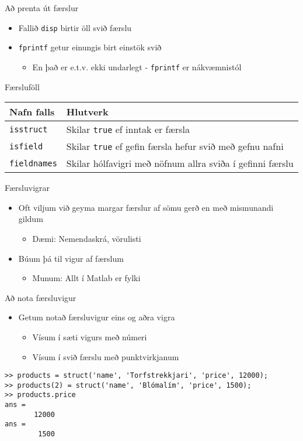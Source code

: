 \documentclass[handout]{beamer}
\begin{document}
\begin{frame}{Að prenta út færslur}
\begin{itemize}
 \item Fallið \texttt{disp} birtir öll svið færslu
 \item \texttt{fprintf} getur einungis birt einstök svið
 \begin{itemize}
  \item En það er e.t.v. ekki undarlegt - \texttt{fprintf} er nákvæmnistól
 \end{itemize}
\end{itemize}
\end{frame}

\begin{frame}{Færsluföll}
\begin{center}
\begin{tabular}{lp{7cm}}
\toprule
Nafn falls&Hlutverk\\
\midrule
\texttt{isstruct}&Skilar \texttt{true} ef inntak er færsla\\
\texttt{isfield}&Skilar \texttt{true} ef gefin færsla hefur svið með gefnu nafni\\
\texttt{fieldnames}&Skilar hólfavigri með nöfnum allra sviða í gefinni færslu\\
\bottomrule
\end{tabular}
\end{center}
\end{frame}

\begin{frame}{Færsluvigrar}
\begin{itemize}
 \item Oft viljum við geyma margar færslur af sömu gerð en með mismunandi gildum
 \begin{itemize}
  \item Dæmi: Nemendaskrá, vörulisti
 \end{itemize}
 \item Búum þá til vigur af færslum
 \begin{itemize}
  \item Munum: Allt í Matlab er fylki
 \end{itemize}
\end{itemize}
\end{frame}

\begin{frame}[fragile]{Að nota færsluvigur}
\begin{itemize}
 \item Getum notað færsluvigur eins og aðra vigra
 \begin{itemize}
  \item Vísum í sæti vigurs með númeri
  \item Vísum í svið færslu með punktvirkjanum
 \end{itemize}
\end{itemize}
\begin{verbatim}
>> products = struct('name', 'Torfstrekkjari', 'price', 12000);
>> products(2) = struct('name', 'Blómalím', 'price', 1500);
>> products.price
ans =
       12000
ans =
        1500
\end{verbatim}

\end{frame}
\end{document}
